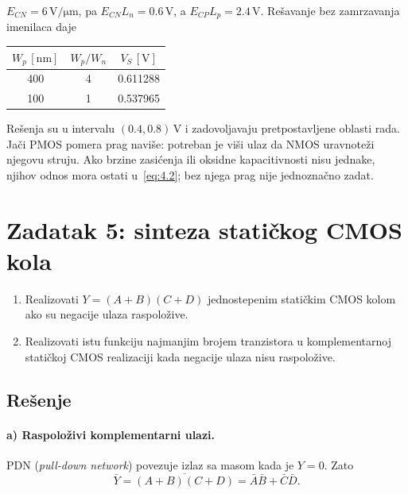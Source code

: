 \documentclass[a4paper,11pt]{article}
\numberwithin{equation}{section}
\newcommand{\redlinija}{\arrayrulecolor{black!28}\specialrule{0.3pt}{2pt}{2pt}\arrayrulecolor{black}}
\begin{document}
$E_{CN}=6\,\mathrm{V/\mu m}$, pa $E_{CN}L_n=0.6\,\mathrm V$, a $E_{CP}L_p=2.4\,\mathrm V$. Rešavanje bez zamrzavanja imenilaca daje
\begin{center}\begin{minipage}{\linewidth}\centering{}\label{tab:4.prag}\begin{tabular}{ccc}\toprule
$W_p\,[\mathrm{nm}]$ & $W_p/W_n$ & $V_S\,[\mathrm V]$\\
\midrule
400 & 4 & 0.611288\\
\redlinija
100 & 1 & 0.537965\\
\bottomrule\end{tabular}\end{minipage}\end{center}
Rešenja su u intervalu $(0.4,0.8)\,\mathrm V$ i zadovoljavaju pretpostavljene oblasti rada. Jači PMOS pomera prag naviše: potreban je viši ulaz da NMOS uravnoteži njegovu struju.
Ako brzine zasićenja ili oksidne kapacitivnosti nisu jednake, njihov odnos mora ostati u~\eqref{eq:4.2}; bez njega prag nije jednoznačno zadat.
\clearpage\section{Zadatak 5: sinteza statičkog CMOS kola}\label{sec:5}
\begin{enumerate}[label=\alph*)]
\item Realizovati $Y=(A+B)(C+D)$ jednostepenim statičkim CMOS kolom ako su negacije ulaza raspoložive.
\item Realizovati istu funkciju najmanjim brojem tranzistora u komplementarnoj statičkoj CMOS realizaciji kada negacije ulaza nisu raspoložive.
\end{enumerate}
\FloatBarrier{}\subsection*{Rešenje}
\FloatBarrier{}\paragraph{a) Raspoloživi komplementarni ulazi.}
PDN (\emph{pull-down network}) povezuje izlaz sa masom kada je $Y=0$. Zato
\begin{equation}\label{eq:5.1}
\bar Y=\overline{(A+B)(C+D)}=\bar A\bar B+\bar C\bar D.
\end{equation}
\end{document}
